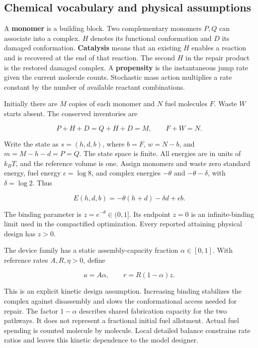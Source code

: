 \documentclass[
  11pt,
]{article}
\begin{document}
\subsection{Chemical vocabulary and physical
assumptions}\label{chemical-vocabulary-and-physical-assumptions}

A \textbf{monomer} is a building block. Two complementary monomers
\(P,Q\) can associate into a complex. \(H\) denotes its functional
conformation and \(D\) its damaged conformation. \textbf{Catalysis}
means that an existing \(H\) enables a reaction and is recovered at the
end of that reaction. The second \(H\) in the repair product is the
restored damaged complex. A \textbf{propensity} is the instantaneous
jump rate given the current molecule counts. Stochastic mass action
multiplies a rate constant by the number of available reactant
combinations.

Initially there are \(M\) copies of each monomer and \(N\) fuel
molecules \(F\). Waste \(W\) starts absent. The conserved inventories
are

\[
P+H+D=Q+H+D=M,\qquad F+W=N.
\]

Write the state as \(s=(h,d,b)\), where \(b=F\), \(w=N-b\), and
\(m=M-h-d=P=Q\). The state space is finite. All energies are in units of
\(k_BT\), and the reference volume is one. Assign monomers and waste
zero standard energy, fuel energy \(\epsilon=\log 8\), and complex
energies \(-\theta\) and \(-\theta-\delta\), with \(\delta=\log2\). Thus

\[
E(h,d,b)=-\theta(h+d)-\delta d+\epsilon b.
\]

The binding parameter is \(z=e^{-\theta}\in(0,1]\). Its endpoint \(z=0\)
is an infinite-binding limit used in the compactified optimization.
Every reported attaining physical design has \(z>0\).

The device family has a static assembly-capacity fraction
\(\alpha\in[0,1]\). With reference rates \(A,R,\eta>0\), define

\[
a=A\alpha,\qquad r=R(1-\alpha)z.
\]

This is an explicit kinetic design assumption. Increasing binding
stabilizes the complex against disassembly and slows the conformational
access needed for repair. The factor \(1-\alpha\) describes shared
fabrication capacity for the two pathways. It does not represent a
fractional initial fuel allotment. Actual fuel spending is counted
molecule by molecule. Local detailed balance constrains rate ratios and
leaves this kinetic dependence to the model designer.
\end{document}
